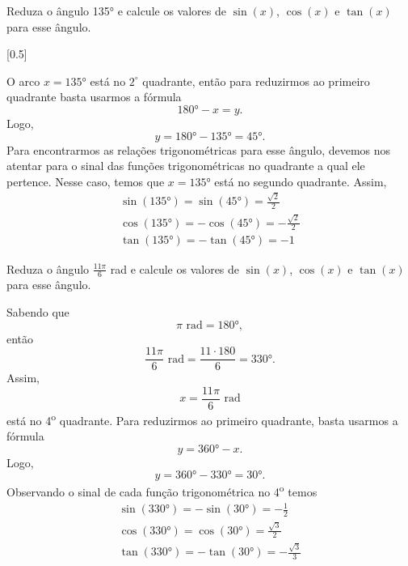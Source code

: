 \begin{example}
  Reduza o ângulo \ang{135}
  e calcule os valores de
  $\sin(x)$, $\cos(x)$ e $\tan(x)$ para esse ângulo.

  \solution

  [0.5]

  O arco $x=\ang{135}$ está no $2^{\circ}$ quadrante, então para
  reduzirmos ao primeiro quadrante basta usarmos a fórmula
  \[
    \ang{180} - x = y.
  \]
  Logo,
  \[
    y
    = \ang{180} - \ang{135}
    = \ang{45}.
  \]
  Para encontrarmos as relações trigonométricas para esse ângulo, devemos
  nos atentar para o sinal das funções trigonométricas no quadrante a qual
  ele pertence. Nesse caso, temos que $x=\ang{135}$ está no segundo
  quadrante. Assim,
  \begin{gather*}
    \sin(\ang{135}) =  \sin(\ang{45}) =  \frac{\sqrt{2}}{2} \\[2mm]
    \cos(\ang{135}) = -\cos(\ang{45}) = -\frac{\sqrt{2}}{2} \\[2mm]
    \tan(\ang{135}) = -\tan(\ang{45}) = -1
  \end{gather*}
\end{example}

\begin{example}
  Reduza o ângulo
  \(\frac{11 \pi}{6}\) rad
  e calcule os valores de
  $\sin(x)$, $\cos(x)$ e $\tan(x)$ para esse ângulo.

  \solution
  Sabendo que
  \[
    \pi \text{ rad} = \ang{180},
  \]
  então
  \[
    \frac{11\pi}{6} \text{ rad}
    = \frac{11 \cdot 180}{6}
    = \ang{330}.
  \]
  Assim,
  \[
    x = \frac{11\pi}{6} \text{ rad}
  \]
  está no 4\textsuperscript{o} quadrante.
  Para reduzirmos ao primeiro quadrante, basta
  usarmos a fórmula
  \[
    y =\ang{360} - x.
  \]
  Logo,
  \[
    y
    = \ang{360} - \ang{330}
    = \ang{30}.
  \]
  Observando o sinal de cada função trigonométrica no
  4\textsuperscript{o} temos
  \begin{gather*}
    \sin(\ang{330}) = -\sin(\ang{30}) = -\frac{1}{2}          \\[2mm]
    \cos(\ang{330}) =  \cos(\ang{30}) =  \frac{\sqrt{3}}{2}   \\[2mm]
    \tan(\ang{330}) = -\tan(\ang{30}) = -\frac{\sqrt{3}}{3}
  \end{gather*}
\end{example}

